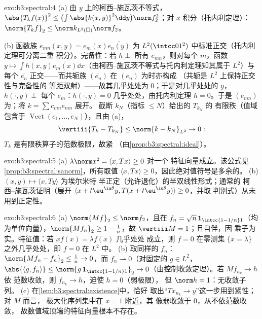 \begin{solution}{exo:b3:spectral:4}
(a) 由 $y$ 上的柯西–施瓦茨不等式，$\abs{T_kf(x)}^2 \leq
\bigl(\int\abs{k(x,y)}^2\dd y\bigr)\norm f_2^2$；对
$x$ 积分（托内利定理）：$\norm{T_kf}_2 \leq \norm k_{L^2(\square)}
\norm f_2$。

(b) 函数族 $e_{mn}(x,y) = e_m(x)\overline{e_n(y)}$ 为
$L^2(\intcc01^2)$ 中标准正交（托内利定理可分离二重
积分）。完备性：若 $h \perp$ 所有 $e_{mn}$，则对每个
$m$，函数 $y \mapsto \int h(x,y)\overline{e_m(x)}\dd
x$（由柯西–施瓦茨不等式与托内利定理知其属于 $L^2$）与
每个 $\overline{e_n}$ 正交——而共轭族
$(\overline{e_n})$ 在 $(e_n)$ 为时亦构成
（共轭是 $L^2$ 上保持正交性与完备性的
等距双射）——故其几乎处处为 $0$；于是对几乎处处的 $y$，$h(\cdot, y) \perp$ 每个
$e_m$：$h(\cdot, y) = 0$ 几乎处处，由托内利定理 $h = 0$。于是
$(e_{mn})$ 为；将 $k = \sum c_{mn}e_{mn}$ 展开。
截断 $k_N$（指标 $\leq N$）给出的 $T_{k_N}$ 的
有限秩（值域包含于 $\operatorname{Vect}(e_1, \dots,
e_N)$），且由 (a)，
\[
\vertiii{T_k - T_{k_N}} \leq \norm{k - k_N}_{L^2} \to 0 :
\]
$T_k$ 是有限秩算子的范数极限，故紧
（由\cref{prop:b3:spectral:ideal}）。
\end{solution}

\begin{solution}{exo:b3:spectral:5}
(a) $\lambda\norm x^2 = \langle x, Tx\rangle \geq 0$ 对一个
特征向量成立。该公式见
\cref{prop:b3:spectral:sanorm}，所有取值 $\langle x,
Tx\rangle \geq 0$，因此绝对值符号是多余的。
(b) $(x, y) \mapsto \langle x, Ty\rangle$ 为埃尔米特
半正定（允许退化）的半双线性形式；通常的
柯西–施瓦茨证明（展开 $\langle x + t\eu^{\iu\theta}y,
T(x + t\eu^{\iu\theta}y)\rangle \geq 0$，并取
判别式）从未用到正定性。
\end{solution}

\begin{solution}{exo:b3:spectral:6}
(a) $\norm{Mf}_2 \leq \norm f_2$，且在 $f_n = \sqrt n\,
\mathbf 1_{\intcc{1 - 1/n}1}$（均为单位向量），$\norm{Mf_n}_2
\geq 1 - \frac1n$，故 $\vertiii M = 1$；且自伴，因
乘子为实。特征值：若 $xf(x) = \lambda f(x)$ 几乎处处
成立，则 $f = 0$ 在零测集 $\{x = \lambda\}$ 之外几乎处处，即 $f =
0$ 在 $L^2$ 中。
(b) 取同样的 $f_n$：$\norm{Mf_n - f_n}_2 \leq \frac1n \to
0$，而 $f_n \rightharpoonup 0$（对固定的 $g \in L^2$，
$\abs{\langle g, f_n\rangle} \leq \norm{g\,\mathbf
1_{\intcc{1-1/n}1}}_2 \to 0$（由控制收敛定理）。若 $Mf_{n_k} \to h$ 依
范数收敛，则 $f_{n_k} \to h$，迫使 $h = 0$（弱极限），
但 $\norm h = 1$：无收敛子列。
(c) 在\cref{lem:b3:spectral:existence}中，恰好
取出“$Tx_{n_k} \to y$”这一步用到紧性；对 $M$ 而言，
极大化序列集中在 $x = 1$ 附近，其
像弱收敛于 $0$，从不依范数收敛，
故数值域顶端的特征向量根本不存在。
\end{solution}

